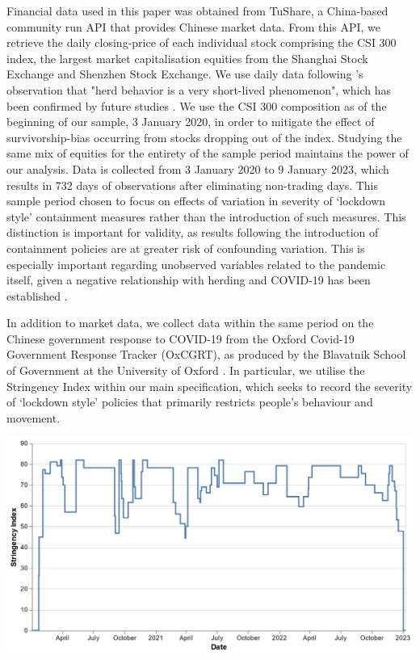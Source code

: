 \documentclass[12pt]{article}
\numberwithin{table}{section}   %
\begin{document}
Financial data used in this paper was obtained from TuShare, a China-based community run API that provides Chinese market data. From this API, we retrieve the daily closing-price of each individual stock comprising the CSI 300 index, the largest market capitalisation equities from the Shanghai Stock Exchange and Shenzhen Stock Exchange. We use daily data following \citet{ch}'s observation that "herd behavior is a very short-lived phenomenon", which has been confirmed by future studies \citep{tan}. We use the CSI 300 composition as of the beginning of our sample, 3 January 2020, in order to mitigate the effect of survivorship-bias occurring from stocks dropping out of the index. Studying the same mix of equities for the entirety of the sample period maintains the power of our analysis. Data is collected from 3 January 2020 to 9 January 2023, which results in 732 days of observations after eliminating non-trading days. This sample period chosen to focus on effects of variation in severity of ‘lockdown style’ containment measures rather than the introduction of such measures. This distinction is important for validity, as results following the introduction of containment policies are at greater risk of confounding variation. This is especially important regarding unobserved variables related to the pandemic itself, given a negative relationship with herding and COVID-19 has been established \cite{wu}.

In addition to market data, we collect data within the same period on the Chinese government response to COVID-19 from the Oxford Covid-19 Government Response Tracker (OxCGRT), as produced by the Blavatnik School of Government at the University of Oxford \citep{OxCGRT}. In particular, we utilise the Stringency Index within our main specification, which seeks to record the severity of ‘lockdown style’ policies that primarily restricts people’s behaviour and movement.

\begin{center}
    \includegraphics[scale=0.4]{graphics/stringency_line.png}
\end{center}
\end{document}
